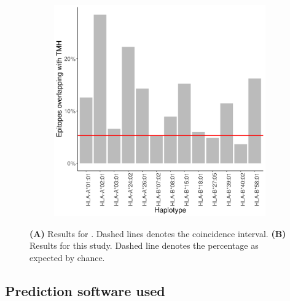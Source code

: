 \begin{figure}
\begin{subfigure}[t]{0.45\textwidth}
    \includegraphics[width=\linewidth]{bbbq_1_smart_results/fig_f_tmh_2_human_mhc1.png}
    \label{fig:bilderbeek_et_al_2021_1a}
  \end{subfigure}

  \caption{
    \textbf{(A)} 
    Results for \cite{bianchi2017}. 
    Dashed lines denotes the coincidence interval.
    \textbf{(B)}
    Results for this study.
    Dashed line denotes the percentage as expected by chance.
  }
\end{figure}

\clearpage

\subsection{Prediction software used}
\label{subsec:prediction_software_used}

